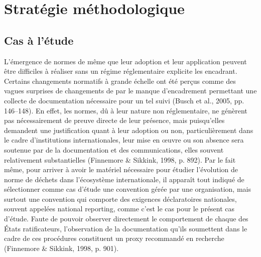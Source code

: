 \documentclass[12pt]{ulaval}
\begin{document}
\section{Stratégie méthodologique}\label{stratuxe9gie-muxe9thodologique}

\subsection{Cas à l'étude}\label{cas-uxe0-luxe9tude}

L'émergence de normes de même que leur adoption et leur application peuvent être difficiles à réaliser sans un régime réglementaire explicite les encadrant. Certains changements normatifs à grande échelle ont été perçus comme des vagues surprises de changements de par le manque d'encadrement permettant une collecte de documentation nécessaire pour un tel suivi (Busch et al., 2005, pp. 146--148). En effet, les normes, dû à leur nature non réglementaire, ne génèrent pas nécessairement de preuve directe de leur présence, mais puisqu'elles demandent une justification quant à leur adoption ou non, particulièrement dans le cadre d'institutions internationales, leur mise en œuvre ou son absence sera soutenue par de la documentation et des communications, elles souvent relativement substantielles (Finnemore \& Sikkink, 1998, p. 892). Par le fait même, pour arriver à avoir le matériel nécessaire pour étudier l'évolution de norme de déchets dans l'écosystème internationale, il apparaît tout indiqué de sélectionner comme cas d'étude une convention gérée par une organisation, mais surtout une convention qui comporte des exigences déclaratoires nationales, souvent appelées national reporting, comme c'est le cas pour le présent cas d'étude. Faute de pouvoir observer directement le comportement de chaque des États ratificateurs, l'observation de la documentation qu'ils soumettent dans le cadre de ces procédures constituent un proxy recommandé en recherche (Finnemore \& Sikkink, 1998, p. 901).
\end{document}
